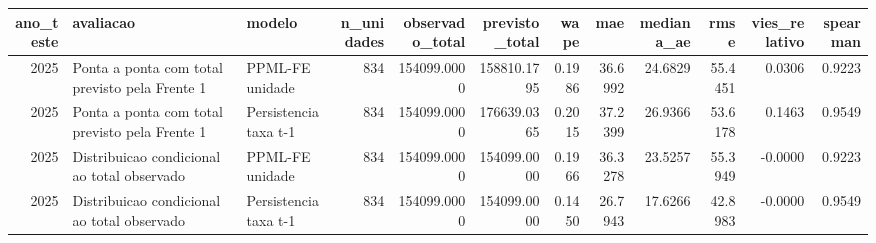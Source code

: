 \begin{tabular}{rllrrrrrrrrr}
\toprule
ano_teste & avaliacao & modelo & n_unidades & observado_total & previsto_total & wape & mae & mediana_ae & rmse & vies_relativo & spearman \\
\midrule
2025 & Ponta a ponta com total previsto pela Frente 1 & PPML-FE unidade & 834 & 154099.0000 & 158810.1795 & 0.1986 & 36.6992 & 24.6829 & 55.4451 & 0.0306 & 0.9223 \\
2025 & Ponta a ponta com total previsto pela Frente 1 & Persistencia taxa t-1 & 834 & 154099.0000 & 176639.0365 & 0.2015 & 37.2399 & 26.9366 & 53.6178 & 0.1463 & 0.9549 \\
2025 & Distribuicao condicional ao total observado & PPML-FE unidade & 834 & 154099.0000 & 154099.0000 & 0.1966 & 36.3278 & 23.5257 & 55.3949 & -0.0000 & 0.9223 \\
2025 & Distribuicao condicional ao total observado & Persistencia taxa t-1 & 834 & 154099.0000 & 154099.0000 & 0.1450 & 26.7943 & 17.6266 & 42.8983 & -0.0000 & 0.9549 \\
\bottomrule
\end{tabular}
